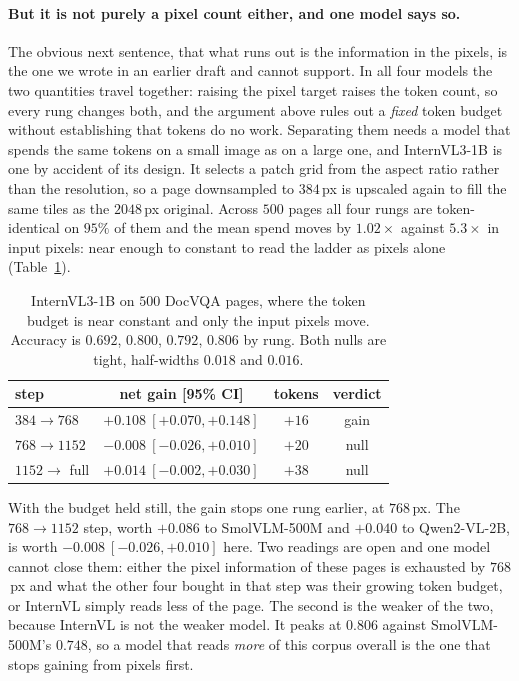 \documentclass[10pt,twocolumn]{article}
\theoremstyle{plain}
\begin{document}
\paragraph{But it is not purely a pixel count either, and one model says so.}
The obvious next sentence, that what runs out is the information in the pixels,
is the one we wrote in an earlier draft and cannot support. In all four models
the two quantities travel together: raising the pixel target raises the token
count, so every rung changes both, and the argument above rules out a
\emph{fixed} token budget without establishing that tokens do no work.
Separating them needs a model that spends the same tokens on a small image as
on a large one, and InternVL3-1B is one by accident of its design. It selects a
patch grid from the aspect ratio rather than the resolution, so a page
downsampled to $384$\,px is upscaled again to fill the same tiles as the
$2048$\,px original. Across $500$ pages all four rungs are token-identical on
$95\%$ of them and the mean spend moves by $1.02\times$ against $5.3\times$ in
input pixels: near enough to constant to read the ladder as pixels alone
(Table~\ref{tab:fixedbudget}).

\begin{table}[t]
\centering\small
\setlength{\tabcolsep}{4pt}
\begin{tabular}{lccc}
\toprule
step & net gain [95\% CI] & tokens & verdict \\
\midrule
$384 \to 768$    & $+0.108\ [+0.070, +0.148]$ & $+16$ & gain \\
$768 \to 1152$   & $-0.008\ [-0.026, +0.010]$ & $+20$ & null \\
$1152 \to$ full  & $+0.014\ [-0.002, +0.030]$ & $+38$ & null \\
\bottomrule
\end{tabular}
\caption{InternVL3-1B on $500$ DocVQA pages, where the token budget is
near constant and only the input pixels move. Accuracy is $0.692$, $0.800$,
$0.792$, $0.806$ by rung. Both nulls are tight, half-widths $0.018$ and
$0.016$.}
\label{tab:fixedbudget}
\end{table}

With the budget held still, the gain stops one rung earlier, at $768$\,px. The
$768 \to 1152$ step, worth $+0.086$ to SmolVLM-500M and $+0.040$ to
Qwen2-VL-2B, is worth $-0.008\ [-0.026, +0.010]$ here. Two readings are open
and one model cannot close them: either the pixel information of these pages is
exhausted by $768$\,px and what the other four bought in that step was their
growing token budget, or InternVL simply reads less of the page. The second is
the weaker of the two, because InternVL is not the weaker model. It peaks at
$0.806$ against SmolVLM-500M's $0.748$, so a model that reads \emph{more} of
this corpus overall is the one that stops gaining from pixels first.
\end{document}
